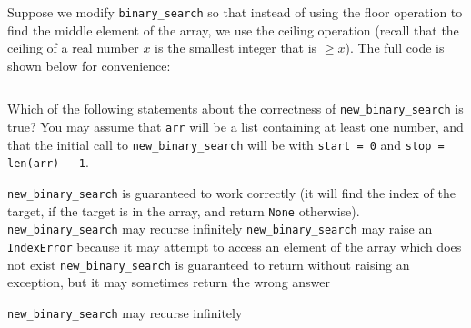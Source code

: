 \begin{prob}

    Suppose we modify \texttt{binary_search} so that instead of using the floor operation
    to find the middle element of the array, we use the ceiling operation (recall that the
    ceiling of a real number $x$ is the smallest integer that is $\geq x$). The full code is
    shown below for convenience:

    \inputminted{python}{./code.py}

    Which of the following statements about the correctness of
    \texttt{new_binary_search} is true? You may assume that \texttt{arr} will
    be a list containing at least one number, and that the initial call to
    \texttt{new_binary_search} will be with \texttt{start = 0} and \texttt{stop
    = len(arr) - 1}.

    \begin{choices}
        \choice \texttt{new_binary_search} is guaranteed to work correctly (it will find the index of
        the target, if the target is in the array, and return \texttt{None} otherwise).
        \correctchoice \texttt{new_binary_search} may recurse infinitely
        \choice \texttt{new_binary_search} may raise an \texttt{IndexError}
        because it may attempt to access an element of the array which does not
        exist
        \choice \texttt{new_binary_search} is guaranteed to return without
        raising an exception, but it may sometimes return the wrong answer
    \end{choices}

    \begin{soln}
        \texttt{new_binary_search} may recurse infinitely
    \end{soln}

\end{prob}
